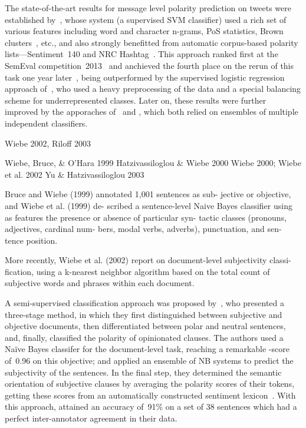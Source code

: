 The state-of-the-art results for message level polarity prediction on
tweets were established by~\citet{Mohammad:13}, whose system (a
supervised SVM classifier) used a rich set of various features
including word and character n-grams, PoS statistics, Brown
clusters~\cite{Brown:92}, etc., and also strongly benefitted from
automatic corpus-based polarity lists---Sentiment~140 and NRC
Hashtag~\cite{Mohammad:12,Kiritchenko:14}.  This approach ranked first
at the SemEval competition~2013~\cite{Nakov:13} and anchieved the
fourth place on the rerun of this task one year
later~\cite{Rosenthal:14}, being outperformed by the supervised
logistic regression approach of~\citet{Miura:14}, who used a heavy
preprocessing of the data and a special balancing scheme for
underrepresented classes.  Later on, these results were further
improved by the apporaches of~\citet{Hagen:15} and \citet{Deriu:16},
which both relied on ensembles of multiple independent classifiers.

\cite{Nakagawa:10}

Wiebe 2002, Riloff 2003

Wiebe, Bruce, \& O'Hara 1999
Hatzivassiloglou \& Wiebe 2000
Wiebe 2000;
Wiebe et al. 2002
Yu \& Hatzivassiloglou 2003

Bruce and Wiebe (1999) annotated 1,001 sentences as sub- jective or
objective, and Wiebe et al. (1999) de- scribed a sentence-level Naive
Bayes classifier using as features the presence or absence of
particular syn- tactic classes (pronouns, adjectives, cardinal num-
bers, modal verbs, adverbs), punctuation, and sen- tence position.

More recently, Wiebe et al.  (2002) report on document-level
subjectivity classi- fication, using a k-nearest neighbor algorithm
based on the total count of subjective words and phrases within each
document.

A semi-supervised classification approach was proposed
by~\citet{Yu:03}, who presented a three-stage method, in which they
first distinguished between subjective and objective documents, then
differentiated between polar and neutral sentences, and, finally,
classified the polarity of opinionated clauses.  The authors used a
Na{\"i}ve Bayes classifer for the document-level task, reaching a
remarkable \F-score of~0.96 on this objective; and applied an ensemble
of NB systems to predict the subjectivity of the sentences.  In the
final step, they determined the semantic orientation of subjective
clauses by averaging the polarity scores of their tokens, getting
these scores from an automatically constructed sentiment
lexicon~\cite{Hatzivassi:97}.  With this approach, \citeauthor{Yu:03}
attained an accuracy of~91\% on a set of 38 sentences which had a
perfect inter-annotator agreement in their data.

